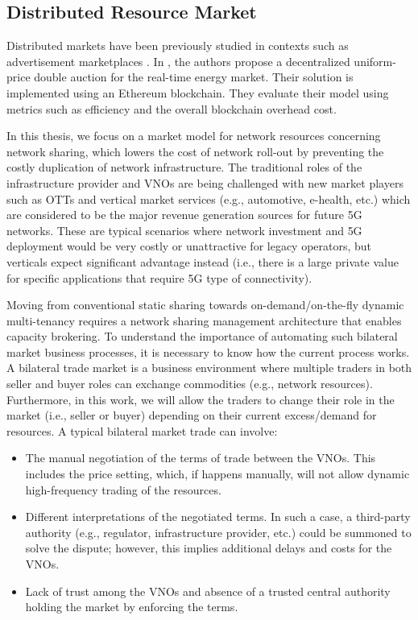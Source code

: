 \subsection{Distributed Resource Market}
Distributed markets have been previously studied in contexts such as advertisement marketplaces \cite{Ranganthan2018ADM}. In \cite{FOTI2019113604}, the authors propose a decentralized uniform-price double auction for the real-time energy market. Their solution is implemented using an Ethereum blockchain. They evaluate their model using metrics such as efficiency and the overall blockchain overhead cost.

In this thesis, we focus on a market model for network resources concerning network sharing, which lowers the cost of network roll-out by preventing the costly duplication of network infrastructure. The traditional roles of the infrastructure provider and \acp{VNO} are being challenged with new market players such as \acp{OTT} and vertical market services (e.g., automotive, e-health, etc.) which are considered to be the major revenue generation sources for future \ac{5G} networks.
These are typical scenarios where network investment and \ac{5G} deployment would be very costly or unattractive for legacy operators, but verticals expect significant advantage instead (i.e., there is a large private value for specific applications that require \ac{5G} type of connectivity).

Moving from conventional static sharing towards on-demand/on-the-fly dynamic multi-tenancy \cite{7514161} requires a network sharing management architecture that enables capacity brokering. To understand the importance of automating such bilateral market business processes, it is necessary to know how the current process works. 
A bilateral trade market is a business environment where multiple traders in both seller and buyer roles can exchange commodities (e.g., network resources). Furthermore, in this work, we will allow the traders to change their role in the market (i.e., seller or buyer) depending on their current excess/demand for resources.
A typical bilateral market trade can involve: 
\begin{itemize}
    \item The manual negotiation of the terms of trade between the \acp{VNO}. This includes the price setting, which, if happens manually, will not allow dynamic high-frequency trading of the resources.
    \item Different interpretations of the negotiated terms. In such a case, a third-party authority (e.g., regulator, infrastructure provider, etc.) could be summoned to solve the dispute; however, this implies additional delays and costs for the \acp{VNO}.
    \item Lack of trust among the \acp{VNO} and absence of a trusted central authority holding the market by enforcing the terms. 
\end{itemize}

